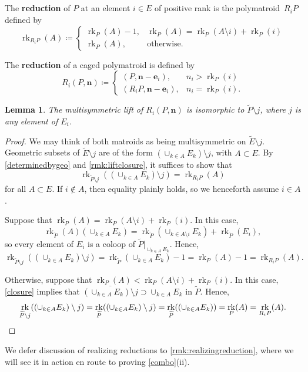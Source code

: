 \documentclass[11pt]{article}
\newtheorem{lemm}[theo]{Lemma}
\theoremstyle{definition}
\numberwithin{equation}{section}
\DeclareMathOperator{\rk}{rk}
\newcommand{\word}[1]{\textbf{#1}}
\begin{document}
\subsection{}
The \word{reduction} of $P$ at an element $i \in E$ of positive rank is the polymatroid~$R_i P$ defined by
\[
  \rk_{R_i P}(A) \coloneqq
  \begin{cases} \rk_P(A) - 1, & \rk_P(A) = \rk_P(A \setminus i) + \rk_P(i) \\
     \rk_P(A), & \text{otherwise.}
   \end{cases}
 \]
 
The \word{reduction} of a caged polymatroid is defined by
\[
  R_i(P, \mathbf n) \coloneqq
  \begin{cases}
    (P, \mathbf n - \mathbf e_i), & n_i > \rk_P(i) \\
    (R_i P, \mathbf n - \mathbf e_i), & n_i = \rk_P(i).
  \end{cases}
 \]

\begin{lemm}\label{reductionlift}
   The multisymmetric lift of $R_i(P, \mathbf n)$ is isomorphic to $\widetilde P \setminus j$, where $j$ is any element of $E_i$.
\end{lemm}
\begin{proof}
  We may think of both matroids as being multisymmetric on $\widetilde E \setminus j$.
  Geometric subsets of $\widetilde E \setminus j$ are of the form $(\cup _{k \in A} E_k) \setminus j$, with $A \subset E$.
  By \cref{determinedbygeo} and \cref{rmk:liftclosure}, it suffices to show that
  \[
    \rk_{\widetilde P \setminus j}((\cup_{k \in A} E_k) \setminus j) = \rk_{R_i P}(A)
  \]
  for all $A \subset E$.
  If $i \not \in A$, then equality plainly holds, so we henceforth assume $i \in A$.
  
  Suppose that $\rk_P(A) = \rk_P(A \setminus i) + \rk_P(i)$.
  In this case, 
  \[
  \rk_{\widetilde P}(A)(\cup_{k \in A} E_k) = \rk_{\widetilde P}(\cup_{k \in A \setminus i} E_k) + \rk_{\widetilde P}(E_i),
  \]
  so every element of $E_i$ is a coloop of $\widetilde P |_{\cup_{k \in A} E_k}$.
    Hence,
  \[
    \rk_{\widetilde P \setminus j}((\cup_{k \in A} E_k) \setminus j) = \rk_{\widetilde P}(\cup_{k \in A} E_k) - 1 = \rk_P(A) - 1 = \rk_{R_i P}(A).
  \]
  
  Otherwise, suppose that $\rk_P(A) < \rk_P(A \setminus i) + \rk_P(i)$.
  In this case, \cref{closure} implies that $\overline{(\cup_{k \in A} E_k) \setminus j} \supset \cup_{k \in A} E_k$ in $\widetilde P$.
  Hence,
  \[
    \rk_{\widetilde P \setminus j}((\cup_{k \in A} E_k) \setminus j)
    = \rk_{\widetilde P}((\cup_{k \in A} E_k) \setminus j)
    = \rk_{\widetilde P}((\cup_{k \in A} E_k))
    = \rk_P(A) = \rk_{R_i P}(A).
  \qedhere \]
\end{proof}
We defer discussion of realizing reductions to \cref{rmk:realizingreduction}, where we will see it in action en route to proving \cref{combo}(ii).
\end{document}
